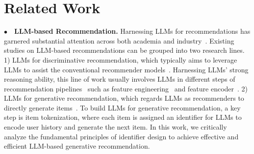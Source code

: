 \section{Related Work}
\label{sec:related_work}

\noindent$\bullet\quad$\textbf{LLM-based Recommendation.} Harnessing LLMs for recommendations has garnered substantial attention across both academia and industry~\cite{sun2024large,zhang2024gpt4rec,fu2024iisan,zhang2024gpt4rec,shi2024large,zhao2024let,zheng2024harnessing,li2024large}. 
Existing studies on LLM-based recommendations can be grouped into two research lines. 
1) LLMs for discriminative recommendation, which typically aims to leverage LLMs to assist the conventional recommender models~\cite{wang2024reinforcement,ren2024enhancing,chen2024enhancing,wu2024coral}.                     
Harnessing LLMs' strong reasoning ability, this line of work usually involves LLMs in different steps of recommendation pipelines~\cite{lin2023can,zhang2024agentcf,zhang2024generative,wang2024automated} such as feature engineering~\cite{xi2024towards,ren2024representation,xi2024towards} and feature encoder~\cite{chen2024hllm}. 
2) LLMs for generative recommendation, which regards LLMs as recommenders to directly generate items~\cite{liao2024llara,kim2024large,lin2024bridging,wang2024eager,li2024large}. 
To build LLMs for generative recommendation, a key step is item tokenization, where each item is assigned an identifier for LLMs to encode user history and generate the next item. 
In this work, we critically analyze the fundamental principles of identifier design to achieve effective and efficient LLM-based generative recommendation. 

